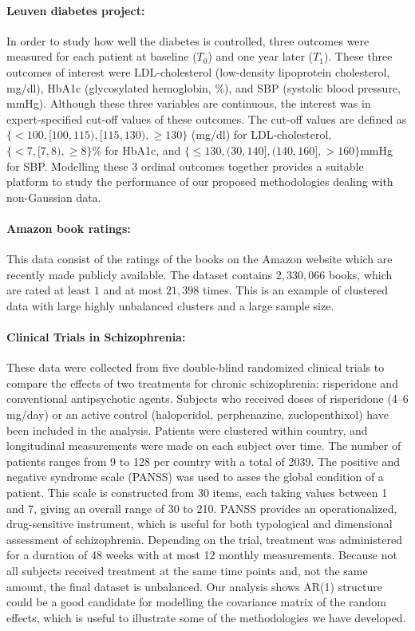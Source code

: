 \documentclass[14pt]{article}
\begin{document}
\paragraph{Leuven diabetes project:} In order to study how well the diabetes is controlled, three outcomes were measured for each patient at baseline ($T_0$) and one year later ($T_1$). These three outcomes of interest were LDL-cholesterol (low-density lipoprotein cholesterol, mg/dl), HbA1c (glycosylated hemoglobin, \%), and SBP (systolic blood pressure, mmHg). Although these three variables are continuous, the interest was in expert-specified cut-off values of these outcomes. The cut-off values are defined as $\{<100, [100,115), [115, 130),\geq 130 \}$ (mg/dl) for LDL-cholesterol, $\{<7, [7, 8), \geq 8\}\%$ for HbA1c, and $\{ \leq 130, (30,140],(140,160],>160\}$mmHg for SBP. Modelling these 3 ordinal outcomes together provides a suitable platform to study the performance of our proposed methodologies dealing with non-Gaussian data.

\paragraph*{Amazon book ratings:} This data consist of the ratings of the books on the Amazon website which are recently made publicly available. The dataset contains $2,330,066$ books, which are rated at least $1$ and at most $21,398$ times. This is an example of clustered data with large highly unbalanced clusters and a large sample size.

\paragraph*{Clinical Trials in Schizophrenia:} These data were collected from five double-blind randomized clinical trials to compare the effects of two treatments for chronic schizophrenia: risperidone and conventional antipsychotic agents. Subjects who received doses of risperidone (4–6 mg/day) or an active control (haloperidol, perphenazine, zuclopenthixol) have been included in the analysis. Patients were clustered within country, and longitudinal measurements were made on each subject over time. The number of patients ranges from 9 to 128 per country with a total of 2039. The
positive and negative syndrome scale (PANSS) was used to asses the global condition of a patient. This scale is constructed from 30 items, each taking values between 1 and 7, giving an overall range of 30 to 210. PANSS provides an operationalized, drug-sensitive instrument, which is useful for both typological and dimensional assessment of schizophrenia. Depending on the trial, treatment was administered for a duration of 48 weeks with at most 12 monthly measurements. Because not all subjects received treatment at the same time points and, not the same amount, the final dataset is unbalanced. Our analysis shows AR(1) structure could be a good candidate for modelling the covariance matrix of the random effects, which is useful to illustrate some of the methodologies we have developed.
\end{document}
